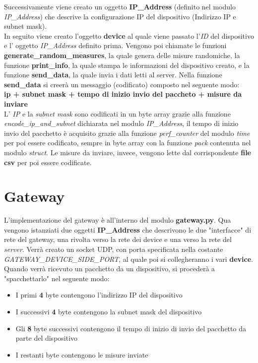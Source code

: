 \documentclass[a4paper, 14pt]{extreport}
\begin{document}
    Successivamente viene creato un oggetto \textbf{IP\_Address} (definito nel modulo \emph{IP\_Address}) 
    che descrive la configurazione IP del dispositivo (Indirizzo IP e subnet mask). \\
    In seguito viene creato l'oggetto \textbf{device} al quale viene passato l'\emph{ID} del dispositivo
    e l' oggetto \emph{IP\_Address} definito prima.
    Vengono poi chiamate le funzioni \textbf{generate\_random\_measures}, la quale genera delle misure randomiche,
    la funzione \textbf{print\_info}, la quale stampa le informazioni del dispositivo creato, e la funzione \textbf{send\_data}, la
    quale invia i dati letti al server.
    Nella funzione \textbf{send\_data} si creerà un messaggio (codificato) composto nel seguente modo: \\
    \textbf{ip + subnet mask + tempo di inizio invio del paccheto + misure da inviare}        \\
    L' \emph{IP} e la \emph{subnet mask} sono codificati in un byte array grazie alla funzione \emph{encode\_ip\_and\_subnet}
    dichiarata nel modulo \emph{IP\_Address}, il tempo di inizio invio del pacchetto è acquisito grazie alla funzione \emph{perf\_counter}
    del modulo \emph{time} per poi essere codificato, sempre in byte array con la funzione \emph{pack} contenuta nel modulo 
    \emph{struct}. Le misure da inviare, invece, vengono lette dal corrispondente \textbf{file csv} per poi essere codificate.

    \pagebreak

    \section{Gateway}
    L'implementazione del gateway è all'interno del modulo \textbf{gateway.py}.
    Qua vengono istanziati due oggetti \textbf{IP\_Address} che descrivono le due "interfacce" di rete
    del gateway, una rivolta verso la rete dei device e una verso la rete del \emph{server}.
    Verrà creato un socket UDP, con porta specificata nella costante \emph{GATEWAY\_DEVICE\_SIDE\_PORT},
    al quale poi si collegheranno i vari \textbf{device}.
    Quando verrà ricevuto un pacchetto da un dispositivo, si procederà a "spacchettarlo" nel seguente modo:

    \begin{itemize}
        \item I primi \textbf{4} byte contengono l'indirizzo IP del dispositivo
        \item I successivi \textbf{4} byte contengono la subnet mask del dispositivo
        \item Gli \textbf{8} byte successivi contengono il tempo di inizio di invio del pacchetto da parte del dispositivo
        \item I restanti byte contengono le misure inviate
    \end{itemize}
\end{document}

